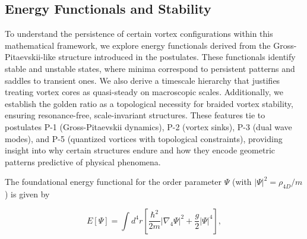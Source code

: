 
\subsection{Energy Functionals and Stability}

To understand the persistence of certain vortex configurations within this mathematical framework, we explore energy functionals derived from the Gross-Pitaevskii-like structure introduced in the postulates. These functionals identify stable and unstable states, where minima correspond to persistent patterns and saddles to transient ones. We also derive a timescale hierarchy that justifies treating vortex cores as quasi-steady on macroscopic scales. Additionally, we establish the golden ratio as a topological necessity for braided vortex stability, ensuring resonance-free, scale-invariant structures. These features tie to postulates P-1 (Gross-Pitaevskii dynamics), P-2 (vortex sinks), P-3 (dual wave modes), and P-5 (quantized vortices with topological constraints), providing insight into why certain structures endure and how they encode geometric patterns predictive of physical phenomena.

The foundational energy functional for the order parameter $\Psi$ (with $|\Psi|^2 = \rho_{4D}/m$) is given by

\begin{equation}
E[\Psi] = \int d^4 r \left[ \frac{\hbar^2}{2m} |\nabla_4 \Psi|^2 + \frac{g}{2} |\Psi|^4 \right],
\end{equation}

